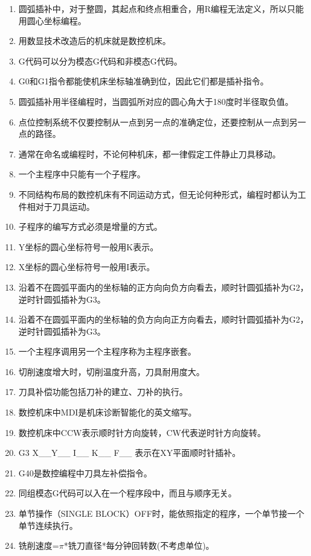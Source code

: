 \documentclass{HUNNUexam}
\begin{document}
\begin{enumerate} [1、]
	\item 圆弧插补中，对于整圆，其起点和终点相重合，用R编程无法定义，所以只能用圆心坐标编程。
	\item 用数显技术改造后的机床就是数控机床。
	\item G代码可以分为模态G代码和非模态G代码。
	\item G0和G1指令都能使机床坐标轴准确到位，因此它们都是插补指令。
	\item 圆弧插补用半径编程时，当圆弧所对应的圆心角大于180度时半径取负值。
	\item 点位控制系统不仅要控制从一点到另一点的准确定位，还要控制从一点到另一点的路径。
	\item 通常在命名或编程时，不论何种机床，都一律假定工件静止刀具移动。
	\item 一个主程序中只能有一个子程序。
	\item 不同结构布局的数控机床有不同运动方式，但无论何种形式，编程时都认为工件相对于刀具运动。
	\item 子程序的编写方式必须是增量的方式。
	\item Y坐标的圆心坐标符号一般用K表示。
	\item X坐标的圆心坐标符号一般用I表示。
	\item 沿着不在圆弧平面内的坐标轴的正方向向负方向看去，顺时针圆弧插补为G2，逆时针圆弧插补为G3。
	\item 沿着不在圆弧平面内的坐标轴的负方向向正方向看去，顺时针圆弧插补为G2，逆时针圆弧插补为G3。
	\item 一个主程序调用另一个主程序称为主程序嵌套。
	\item 切削速度增大时，切削温度升高，刀具耐用度大。
	\item 刀具补偿功能包括刀补的建立、刀补的执行。
	\item 数控机床中MDI是机床诊断智能化的英文缩写。
	\item 数控机床中CCW表示顺时针方向旋转，CW代表逆时针方向旋转。
	\item G3 X\_\_Y\_\_ I\_\_ K\_\_ F\_\_ 表示在XY平面顺时针插补。
	\item G40是数控编程中刀具左补偿指令。
	\item 同组模态G代码可以入在一个程序段中，而且与顺序无关。
	\item 单节操作（SINGLE BLOCK）OFF时，能依照指定的程序，一个单节接一个单节连续执行。
	\item 铣削速度=$\pi$*铣刀直径*每分钟回转数(不考虑单位)。

\end{enumerate}
\end{document}

